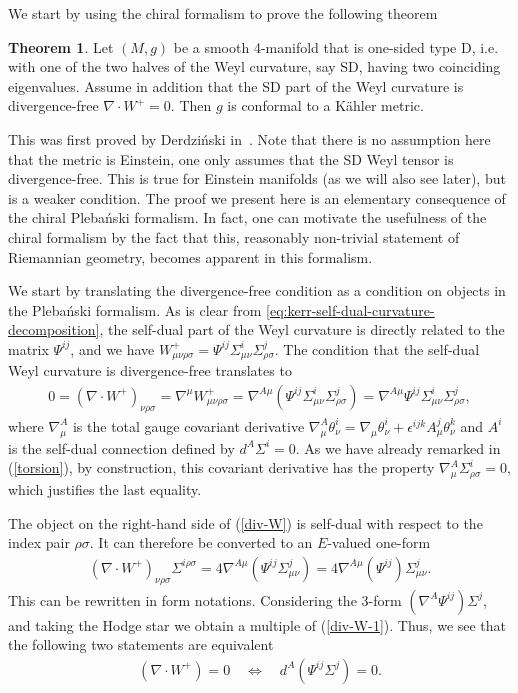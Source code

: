 \documentclass[10pt]{report}
\newcommand{\pleb}[0]{Pleba\'nski}
\newcommand{\derd}[0]{Derdzi\'nski}
\theoremstyle{definition}
\newtheorem{theorem}{Theorem}[chapter]
\begin{document}
We start by using the chiral formalism to prove the following theorem 
\begin{theorem}\label{thrm:DerdziConfKahler}
    Let $(M,g)$ be a smooth 4-manifold that is one-sided type D, i.e. with one of the two halves of the Weyl curvature, say SD, having two coinciding eigenvalues. Assume in addition that the SD part of the Weyl curvature is divergence-free $\nabla \cdot W^+ = 0$. Then $g$ is conformal to a K\"ahler metric. 
\end{theorem}

This was first proved by \derd{} in~\cite{SelfDualKahleDerdzi1983}. Note that there is no assumption here that the metric is Einstein, one only assumes that the SD Weyl tensor is divergence-free. This is true for Einstein manifolds (as we will also see later), but is a weaker condition. The proof we present here is an elementary consequence of the chiral \pleb{} formalism. In fact, one can motivate the usefulness of the chiral formalism by the fact that this, reasonably non-trivial statement of Riemannian geometry, becomes apparent in this formalism. 

We start by translating the divergence-free condition as a condition on objects in the \pleb{} formalism. As is clear from \cref{eq:kerr-self-dual-curvature-decomposition}, the self-dual part of the Weyl curvature is directly related to the matrix $\Psi^{ij}$, and we have $W^+_{\mu \nu \rho \sigma} = \Psi^{ij} \Sigma^i_{\mu\nu} \Sigma^j_{\rho\sigma}$.
The condition that the self-dual Weyl curvature is divergence-free translates to
\begin{align}\label{div-W}
    0 = (\nabla \cdot W^+)_{\nu \rho \sigma} = \nabla^\mu W^+_{\mu \nu \rho \sigma} = \nabla^{A\mu} \left( \Psi^{ij} \Sigma^i_{\mu \nu} \Sigma^j_{\rho\sigma} \right) = \nabla^{A\mu} \Psi^{ij} \Sigma^i_{\mu \nu} \Sigma^j_{\rho \sigma},
\end{align}
where $\nabla^A_\mu$ is the total gauge covariant derivative $\nabla^A_\mu \theta^i_\nu = \nabla_\mu \theta^i_\nu + \epsilon^{ijk} A^j_\mu \theta^k_\nu$ and $A^i$ is the self-dual connection defined by $d^A \Sigma^i = 0$. As we have already remarked in (\ref{torsion}), by construction, this covariant derivative has the property $\nabla_\mu^A \Sigma^i_{\rho\sigma}=0$, which justifies the last equality. 

The object on the right-hand side of (\ref{div-W}) is self-dual with respect to the index pair $\rho\sigma$. It can therefore be converted to an $E$-valued one-form 
\begin{align}\label{div-W-1} 
    (\nabla \cdot W^+)_{\nu \rho \sigma} \Sigma^{i\rho\sigma} = 4\nabla^{A\mu}(\Psi^{ij} \Sigma^j_{\mu \nu}) =4 \nabla^{A\mu}(\Psi^{ij}) \Sigma^j_{\mu \nu}.
\end{align}
This can be rewritten in form notations. Considering the 3-form $(\nabla^A \Psi^{ij}) \Sigma^j$, and taking the Hodge star we obtain a multiple of (\ref{div-W-1}). Thus, we see that the following two statements are equivalent
\begin{align}
    (\nabla \cdot W^+) = 0 \quad \Longleftrightarrow   \quad d^A (\Psi^{ij} \Sigma^j) = 0. \label{eq:Divergence_Free_SD_Weyl}
\end{align}
\end{document}
